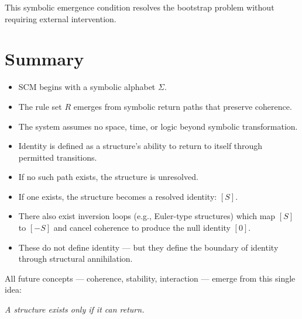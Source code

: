 This symbolic emergence condition resolves the bootstrap problem without requiring external intervention.

\section{Summary} \label{summary}

\begin{itemize}
  \item SCM begins with a symbolic alphabet $\Sigma$.
  \item The rule set $R$ emerges from symbolic return paths that preserve coherence.
  \item The system assumes no space, time, or logic beyond symbolic transformation.
  \item Identity is defined as a structure's ability to return to itself through permitted transitions.
  \item If no such path exists, the structure is unresolved.
  \item If one exists, the structure becomes a resolved identity: $[S]$.
  \item There also exist inversion loops (e.g., Euler-type structures) which map $[S]$ to $[-S]$ and cancel coherence to produce the null identity $[0]$.
  \item These do not define identity — but they define the boundary of identity through structural annihilation.
\end{itemize}

All future concepts — coherence, stability, interaction — emerge from this single idea:
\begin{center}
\emph{A structure exists only if it can return.}
\end{center}